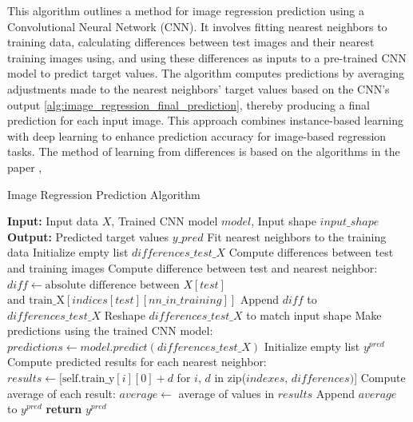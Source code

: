 \documentclass[a4paper, 12pt]{report}
\begin{document}
This algorithm outlines a method for image regression prediction using a Convolutional Neural Network (CNN). 
It involves fitting nearest neighbors to training data, calculating differences between test images and 
their nearest training images using, and using these differences as inputs to a pre-trained CNN model to predict 
target values. The algorithm computes predictions by averaging adjustments made to the nearest neighbors' 
target values based on the CNN's output \ref{alg:image_regression_final_prediction}, thereby producing a final prediction for each input image. 
This approach combines instance-based learning with deep learning to enhance prediction accuracy 
for image-based regression tasks. The method of learning from differences is based on the algorithms in the paper \cite{learningFromDifferences2022},
\begin{algorithm}[H]
    \caption{Image Regression Prediction Algorithm}
    \label{alg:image_regression_final_prediction}
    \begin{algorithmic}[1]
            \State \textbf{Input:} Input data $X$, Trained CNN model $model$, Input shape $input\_shape$
            \State \textbf{Output:} Predicted target values $y\_pred$
            \State Fit nearest neighbors to the training data
            \State Initialize empty list $differences\_test\_X$
            \State Compute differences between test and training images
                    \State Compute difference between test and nearest neighbor: 
                    \State $diff \gets \text{absolute difference between}$ $X[test]$ 
                    \State \hspace{\algorithmicindent} $\text{and train\_X}[indices[test][nn\_in\_training]]$
                    \State Append $diff$ to $differences\_test\_X$
                \EndFor
            \EndFor
            \State Reshape $differences\_test\_X$ to match input shape
            \State Make predictions using the trained CNN model: 
            \State $predictions \gets model.predict(differences\_test\_X)$
            \State Initialize empty list $y^{pred}$
                \State Compute predicted results for each nearest neighbor:
                \State \quad $results \gets [\text{self.train\_y}[i][0] + d$ for $i$, $d$ in zip($indexes$, $differences)$]
                \State Compute average of each result: $average \gets$ average of values in $results$
                \State Append $average$ to $y^{pred}$
            \EndFor
            \State \textbf{return} $y^{pred}$
        \EndFunction
    \end{algorithmic}
\end{algorithm}
\end{document}
